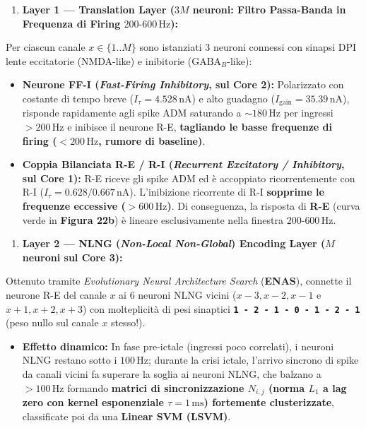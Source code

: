 \documentclass[11pt,a4paper]{article}
\begin{document}
\begin{enumerate}
  \item \textbf{Layer 1 --- Translation Layer ($3M$ neuroni: Filtro Passa-Banda in Frequenza di Firing $200\text{-}600\,\text{Hz}$):}
\end{enumerate}
Per ciascun canale $x \in \{1..M\}$ sono istanziati 3 neuroni connessi con sinapsi DPI lente eccitatorie (NMDA-like) e inibitorie ($\text{GABA}_B$-like):
\begin{itemize}
  \item \textbf{Neurone FF-I (\textit{Fast-Firing Inhibitory}, sul Core 2):} Polarizzato con costante di tempo breve ($I_\tau = 4.528\,\text{nA}$) e alto guadagno ($I_{\text{gain}} = 35.39\,\text{nA}$), risponde rapidamente agli spike ADM saturando a $\sim 180\,\text{Hz}$ per ingressi $>200\,\text{Hz}$ e inibisce il neurone R-E, \textbf{tagliando le basse frequenze di firing ($<200\,\text{Hz}$, rumore di baseline)}.
  \item \textbf{Coppia Bilanciata R-E / R-I (\textit{Recurrent Excitatory / Inhibitory}, sul Core 1):} R-E riceve gli spike ADM ed è accoppiato ricorrentemente con R-I ($I_\tau = 0.628 / 0.667\,\text{nA}$). L'inibizione ricorrente di R-I \textbf{sopprime le frequenze eccessive ($>600\,\text{Hz}$)}. Di conseguenza, la risposta di \textbf{R-E} (curva verde in \textbf{Figura 22b}) è lineare esclusivamente nella finestra \textbf{$200\text{-}600\,\text{Hz}$}.
\end{itemize}
\begin{enumerate}
  \item \textbf{Layer 2 --- NLNG (\textit{Non-Local Non-Global}) Encoding Layer ($M$ neuroni sul Core 3):}
\end{enumerate}
Ottenuto tramite \textit{Evolutionary Neural Architecture Search} (\textbf{ENAS}), connette il neurone R-E del canale $x$ ai 6 neuroni NLNG vicini ($x-3, x-2, x-1$ e $x+1, x+2, x+3$) con molteplicità di pesi sinaptici \textbf{\texttt{1 - 2 - 1 - 0 - 1 - 2 - 1}} (peso nullo sul canale $x$ stesso!).
\begin{itemize}
  \item \textbf{Effetto dinamico:} In fase pre-ictale (ingressi poco correlati), i neuroni NLNG restano sotto i $100\,\text{Hz}$; durante la crisi ictale, l'arrivo sincrono di spike da canali vicini fa superare la soglia ai neuroni NLNG, che balzano a \textbf{$>100\,\text{Hz}$} formando \textbf{matrici di sincronizzazione $N_{i,j}$ (norma $L_1$ a lag zero con kernel esponenziale $\tau = 1\,\text{ms}$) fortemente clusterizzate}, classificate poi da una \textbf{Linear SVM (LSVM)}.
\end{itemize}
\end{document}
